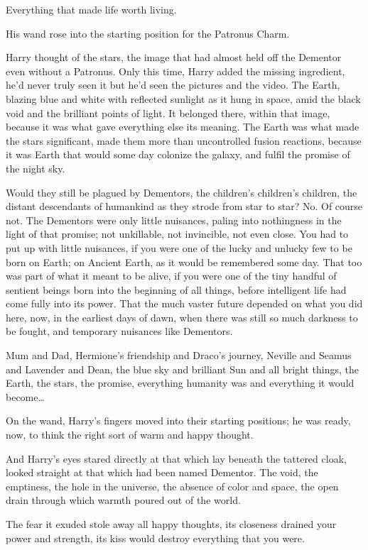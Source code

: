 Everything that made life worth living.

His wand rose into the starting position for the Patronus Charm.

Harry thought of the stars, the image that had almost held off the Dementor even without a Patronus. Only this time, Harry added the missing ingredient, he'd never truly seen it but he'd seen the pictures and the video. The Earth, blazing blue and white with reflected sunlight as it hung in space, amid the black void and the brilliant points of light. It belonged there, within that image, because it was what gave everything else its meaning. The Earth was what made the stars significant, made them more than uncontrolled fusion reactions, because it was Earth that would some day colonize the galaxy, and fulfil the promise of the night sky.

Would they still be plagued by Dementors, the children's children's children, the distant descendants of humankind as they strode from star to star? No. Of course not. The Dementors were only little nuisances, paling into nothingness in the light of that promise; not unkillable, not invincible, not even close. You had to put up with little nuisances, if you were one of the lucky and unlucky few to be born on Earth; on Ancient Earth, as it would be remembered some day. That too was part of what it meant to be alive, if you were one of the tiny handful of sentient beings born into the beginning of all things, before intelligent life had come fully into its power. That the much vaster future depended on what you did here, now, in the earliest days of dawn, when there was still so much darkness to be fought, and temporary nuisances like Dementors.

Mum and Dad, Hermione's friendship and Draco's journey, Neville and Seamus and Lavender and Dean, the blue sky and brilliant Sun and all bright things, the Earth, the stars, the promise, everything humanity was and everything it would become{\ldots}

On the wand, Harry's fingers moved into their starting positions; he was ready, now, to think the right sort of warm and happy thought.

And Harry's eyes stared directly at that which lay beneath the tattered cloak, looked straight at that which had been named Dementor. The void, the emptiness, the hole in the universe, the absence of color and space, the open drain through which warmth poured out of the world.

The fear it exuded stole away all happy thoughts, its closeness drained your power and strength, its kiss would destroy everything that you were.

